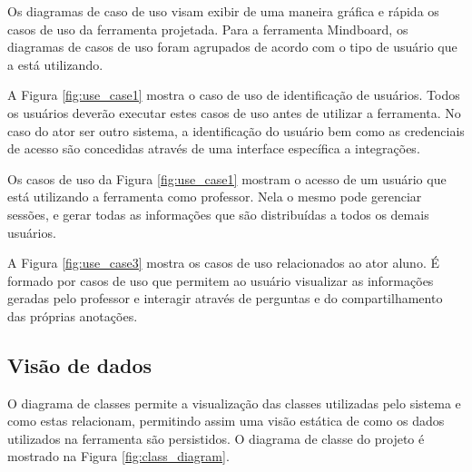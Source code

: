 Os diagramas de caso de uso visam exibir de uma maneira gráfica e rápida os casos de uso da ferramenta projetada. Para a ferramenta Mindboard, os diagramas de casos de uso foram agrupados de acordo com o tipo de usuário que a está utilizando. 

A Figura \ref{fig:use_case1} mostra o caso de uso de identificação de usuários. Todos os usuários deverão executar estes casos de uso antes de utilizar a ferramenta. No caso do ator ser outro sistema, a identificação do usuário bem como as credenciais de acesso são concedidas através de uma interface específica a integrações.
 

Os casos de uso da Figura \ref{fig:use_case1} mostram o acesso de um usuário que está utilizando a ferramenta como professor. Nela o mesmo pode gerenciar sessões, e gerar todas as informações que são distribuídas a todos os demais usuários.

 


A Figura \ref{fig:use_case3} mostra os casos de uso relacionados ao ator aluno. É formado por casos de uso que permitem ao usuário visualizar as informações geradas pelo professor e interagir através de perguntas e do compartilhamento das próprias anotações.

 

\subsection{Visão de dados}

O diagrama de classes permite a visualização das classes utilizadas pelo sistema e como estas relacionam, permitindo assim uma visão estática de como os dados utilizados na ferramenta são persistidos. O diagrama de classe do projeto é mostrado na Figura \ref{fig:class_diagram}.

